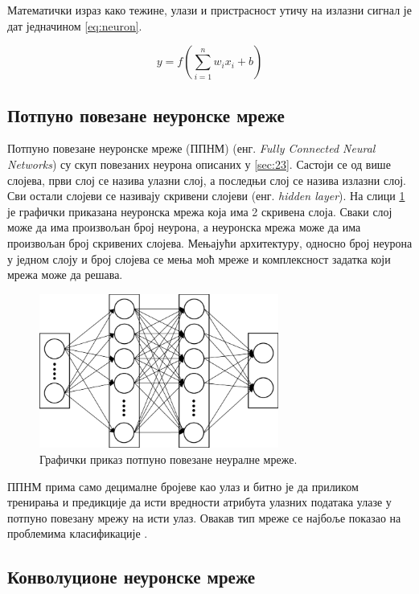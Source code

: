 \documentclass[a4paper, 12pt, master, utf8]{etf}
\begin{document}
Математички израз како тежине, улази и пристрасност утичу на излазни сигнал је дат једначином \ref{eq:neuron}.
\newline

\begin{equation}
    y = f\left(\sum_{i=1}^{n} w_i x_i + b\right)
    \label{eq:neuron}
\end{equation}
\subsection{Потпуно повезане неуронске мреже}
\label{sec:232}

Потпуно повезане неуронске мреже (ППНМ) (енг. \textit{Fully Connected Neural Networks}) су скуп повезаних неурона описаних у \ref{sec:23}. Састоји се од више слојева, први слој се назива улазни слој,
а последњи слој се назива излазни слој. Сви остали слојеви се називају скривени слојеви (енг. \textit{hidden layer}). На слици \ref{fig:fc} је графички приказана неуронска мрежа која има 2 скривена слоја.
Сваки слој може да има произвољан број неурона, а неуронска мрежа може да има произвољан број скривених слојева. Мењајући архитектуру, односно број неурона у једном слоју и број слојева
се мења моћ мреже и комплексност задатка који мрежа може да решава.


\begin{figure}[h]
    \centering
    \includegraphics[width=0.7\textwidth]{images/fc.png}
    \caption{Графички приказ потпуно повезане неуралне мреже. \cite{anwar_learned_2017}}
    \label{fig:fc}
\end{figure}


ППНМ прима само децималне бројеве као улаз и битно је да приликом тренирања и предикције да исти вредности атрибута улазних података улазе у потпуно повезану мрежу на исти улаз.
Овакав тип мреже се најбоље показао на проблемима класификације \cite{noauthor_artificial_2023}.

\subsection{Конволуционе неуронске мреже}
\label{sec:232}
\end{document}
